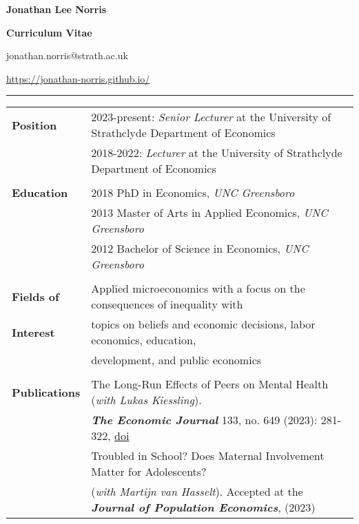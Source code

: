 \documentclass[11pt,a4paper]{article}
\begin{document}
	
\begin{center}

\textsf{{\Large\textbf{Jonathan Lee Norris}}}		
\smallskip	
	
\textsf{{\Large \textbf{Curriculum Vitae}}} 
\smallskip
	
\textsf{jonathan.norris@strath.ac.uk}

\textsf{\url{https://jonathan-norris.github.io/}}	
\end{center}	
	\hrule height 1pt

\bigskip

\begin{longtable}{l l}
\textbf{Position}          &  2023-present: \textit{Senior Lecturer} at the University of Strathclyde Department of Economics \\
																			 &  2018-2022: \textit{Lecturer} at the University of Strathclyde Department of Economics  \\
                                       &  \\
\textbf{Education}      &   2018 PhD in Economics, \textit{UNC Greensboro}	  \\
																			 &   2013 Master of Arts in Applied Economics, \textit{UNC Greensboro}    \\
																			 &   2012 Bachelor of Science in Economics, \textit{UNC Greensboro}	   \\
																			 &   \\ 
\textbf{Fields of}         &   Applied microeconomics with a focus on the consequences of inequality with    \\
\textbf{Interest}					 &   topics on beliefs and economic decisions, labor economics, education,     \\
                           &   development, and public economics \\       
																			 &   \\
\textbf{Publications}                   &  The Long-Run Effects of Peers on Mental Health (\textit{with Lukas Kiessling}).     \\
																				&  \textbf{\textit{The Economic Journal}} 133, no. 649 (2023): 281-322, \href{https://doi.org/10.1093/ej/ueac039}{doi}  \\ 
\addlinespace
																				&  Troubled in School? Does Maternal Involvement Matter for Adolescents?  \\
																				&  (\textit{with Martijn van Hasselt}). Accepted at the \textbf{\textit{Journal of Population Economics}}, (2023)  \\

\end{longtable}
\end{document}
